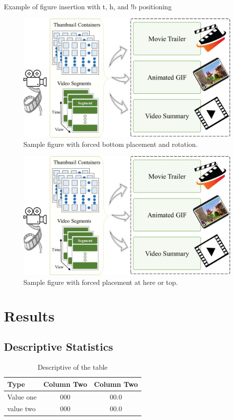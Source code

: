\documentclass[stu,12pt,floatsintext]{apa7}
\begin{document}
Example of figure insertion with t, h, and !b positioning 

\begin{figure}[!b]
    \centering
    \includegraphics[angle=90, width=0.5\linewidth]{figures/sample_img.png}
    \caption{Sample figure with forced bottom placement and rotation.}
    \label{fig:sample_figre}
\end{figure}



\begin{figure}[!ht]
    \centering
    \includegraphics[width=0.6\linewidth]{figures/sample_img.png}
    \caption{Sample figure with forced placement at here or top.}
    \label{fig:sample_figure}
\end{figure}

\section{Results}

\subsection{Descriptive Statistics}
\begin{table}[ht]
    \caption{Descriptive of the table}
    \centering
    \begin{tabular}{lcc}
        \hline
        Type &  Column Two & Column Two \\
        \hline
        Value one & 000 & 00.0 \\
        value two & 000 & 00.0 \\
        \hline
    \end{tabular}
    \label{tab:descriptive_stats}
\end{table}
\end{document}

